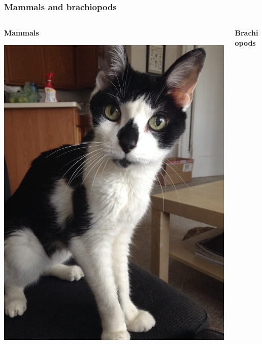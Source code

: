 \documentclass{beamer}
\begin{document}
%




\begin{frame}
  \frametitle{Mammals and brachiopods}

  \begin{columns}
    \begin{column}{0.5\textwidth}
      \begin{center}
        \textbf{Mammals}

        \vspace{0.5cm}

        \includegraphics[height = 0.6\textheight, keepaspectratio = true]{figure/monty}
      \end{center}
    \end{column}
    \begin{column}{0.5\textwidth}
      \begin{center}
        \textbf{Brachiopods}


\end{center}
\end{column}
\end{columns}
\end{frame}
\end{document}
